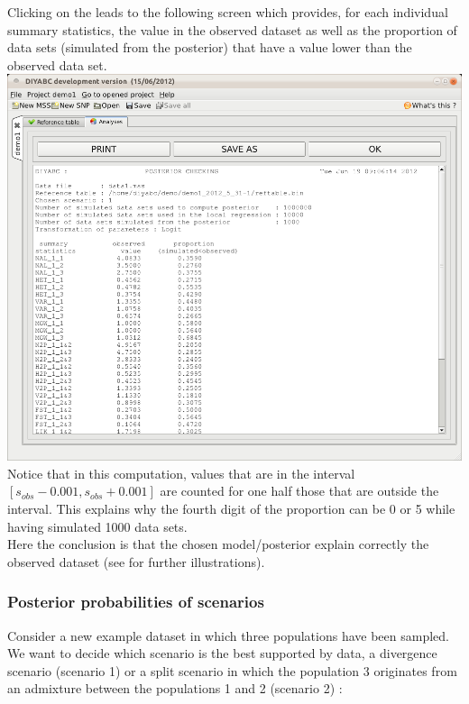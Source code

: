 Clicking on the  leads to
the following screen which provides, for each individual summary statistics,
the value in the observed dataset as well as the proportion of data
sets (simulated from the posterior) that have a value lower than the
observed data set.\\


\includegraphics[scale=0.33]{gui_pictures/Capture-DIYABC-60} \\


Notice that in this computation, values that are in the interval $[s_{obs}-0.001,s_{obs}+0.001]$
are counted for one half those that are outside the interval. This
explains why the fourth digit of the proportion can be 0 or 5 while
having simulated 1000 data sets.\\
 Here the conclusion is that the chosen model/posterior explain correctly
the observed dataset (see \citet{C2010} for further illustrations).


\subsubsection{Posterior probabilities of scenarios}

Consider a new example dataset in which three populations have been
sampled. We want to decide which scenario is the best supported by
data, a divergence scenario (scenario 1) or a split scenario in which
the population 3 originates from an admixture between the populations
1 and 2 (scenario 2) :

